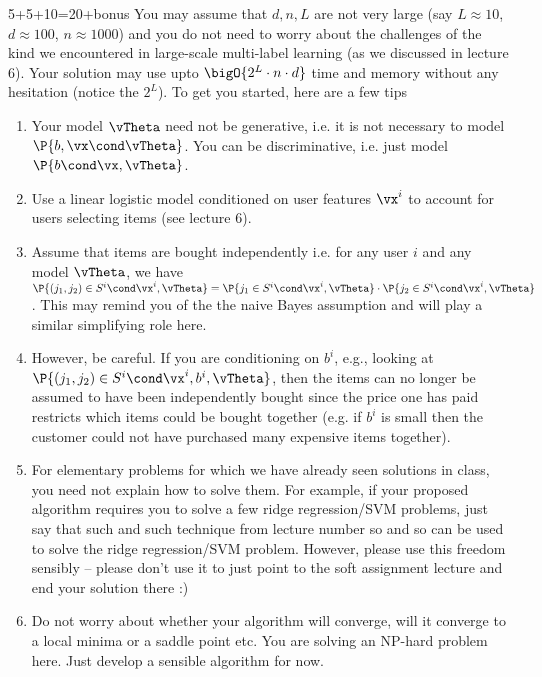 \documentclass[a4paper,11pt]{article}
\begin{document}
\begin{mlproblem}{5+5+10=20+bonus}
You may assume that $d,n,L$ are not very large (say $L \approx 10$, $d \approx 100$, $n \approx 1000$) and you do not need to worry about the challenges of the kind we encountered in large-scale multi-label learning (as we discussed in lecture 6). Your solution may use upto $\bigO{2^L\cdot n\cdot d}$ time and memory without any hesitation (notice the $2^L$). To get you started, here are a few tips
\begin{enumerate}
	\item Your model $\vTheta$ need not be generative, i.e. it is not necessary to model $\P{b,\vx\cond\vTheta}$. You can be discriminative, i.e. just model $\P{b\cond\vx,\vTheta}$.
	\item Use a linear logistic model conditioned on user features $\vx^i$ to account for users selecting items (see lecture 6).
	\item Assume that items are bought independently i.e. for any user $i$ and any model $\vTheta$, we have $\P{(j_1,j_2) \in S^i \cond \vx^i,\vTheta} = \P{j_1 \in S^i \cond \vx^i,\vTheta}\cdot\P{j_2 \in S^i \cond \vx^i,\vTheta}$. This may remind you of the the naive Bayes assumption and will play a similar simplifying role here.
	\item However, be careful. If you are conditioning on $b^i$, e.g., looking at $\P{(j_1,j_2) \in S^i \cond \vx^i,b^i,\vTheta}$, then the items can no longer be assumed to have been independently bought since the price one has paid restricts which items could be bought together (e.g. if $b^i$ is small then the customer could not have purchased many expensive items together).
	\item For elementary problems for which we have already seen solutions in class, you need not explain how to solve them. For example, if your proposed algorithm requires you to solve a few ridge regression/SVM problems, just say that such and such technique from lecture number so and so can be used to solve the ridge regression/SVM problem. However, please use this freedom sensibly -- please don't use it to just point to the soft assignment lecture and end your solution there :)
	\item Do not worry about whether your algorithm will converge, will it converge to a local minima or a saddle point etc. You are solving an NP-hard problem here. Just develop a sensible algorithm for now.
\end{enumerate}
\end{mlproblem}
\end{document}
